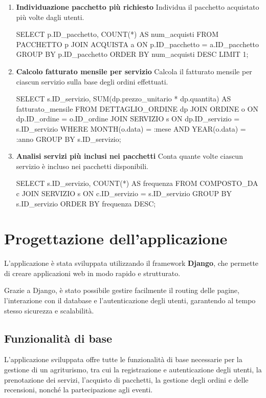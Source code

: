 \documentclass[a4paper,12pt]{report}
\begin{document}
\begin{enumerate}[label=\textbf{\arabic*.}]
	\item \textbf{Individuazione pacchetto più richiesto} \newline
	      Individua il pacchetto acquistato più volte dagli utenti.
\begin{sqlcode}
SELECT p.ID_pacchetto, COUNT(*) AS num_acquisti
FROM PACCHETTO p
JOIN ACQUISTA a ON p.ID_pacchetto = a.ID_pacchetto
GROUP BY p.ID_pacchetto
ORDER BY num_acquisti DESC
LIMIT 1;
\end{sqlcode}

	\item \textbf{Calcolo fatturato mensile per servizio} \newline
	      Calcola il fatturato mensile per ciascun servizio sulla base degli ordini effettuati.
\begin{sqlcode}
SELECT s.ID_servizio, SUM(dp.prezzo_unitario * dp.quantita) AS fatturato_mensile
FROM DETTAGLIO_ORDINE dp
JOIN ORDINE o ON dp.ID_ordine = o.ID_ordine
JOIN SERVIZIO s ON dp.ID_servizio = s.ID_servizio
WHERE MONTH(o.data) = :mese AND YEAR(o.data) = :anno
GROUP BY s.ID_servizio;
\end{sqlcode}

	\item \textbf{Analisi servizi più inclusi nei pacchetti} \newline
	      Conta quante volte ciascun servizio è incluso nei pacchetti disponibili.
\begin{sqlcode}
SELECT s.ID_servizio, COUNT(*) AS frequenza
FROM COMPOSTO_DA c
JOIN SERVIZIO s ON c.ID_servizio = s.ID_servizio
GROUP BY s.ID_servizio
ORDER BY frequenza DESC;
\end{sqlcode}

\end{enumerate}

\chapter{Progettazione dell'applicazione}
L'applicazione è stata sviluppata utilizzando il framework \textbf{Django}, che permette
di creare applicazioni web in modo rapido e strutturato.

Grazie a Django, è stato possibile gestire facilmente il routing
delle pagine, l'interazione con il database e l'autenticazione degli utenti,
garantendo al tempo stesso sicurezza e scalabilità.

\section{Funzionalità di base}
L'applicazione sviluppata offre tutte le funzionalità di base necessarie per la gestione di un
agriturismo, tra cui la registrazione e autenticazione degli utenti, la prenotazione dei servizi,
l'acquisto di pacchetti, la gestione degli ordini e delle recensioni, nonché la partecipazione agli
eventi.
\end{document}
